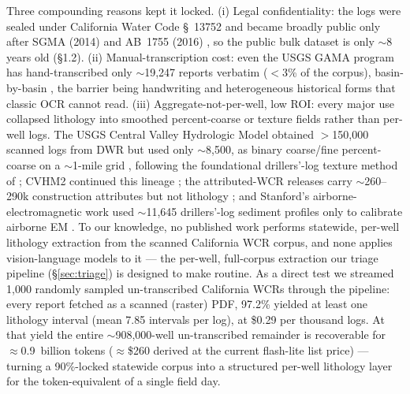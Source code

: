 \documentclass[12pt]{article}
\begin{document}
Three compounding reasons kept it locked. (i) Legal confidentiality: the logs were sealed under
California Water Code \S~13752 \citep{ca_watercode_13752} and became broadly public only after SGMA (2014) and
AB~1755 (2016) \citep{ca_ab1755}, so the public bulk dataset is only $\sim$8 years old (\S1.2).
(ii) Manual-transcription cost: even the USGS GAMA program has hand-transcribed only $\sim$19{,}247
reports verbatim ($<$3\% of the corpus), basin-by-basin \citep{haugen2023_gama}, the barrier being handwriting
and heterogeneous historical forms that classic OCR cannot read. (iii) Aggregate-not-per-well, low ROI:
every major use collapsed lithology into smoothed percent-coarse or texture fields rather than per-well logs.
The USGS Central Valley Hydrologic Model obtained $>$150{,}000 scanned logs from DWR but used only $\sim$8{,}500,
as binary coarse/fine percent-coarse on a $\sim$1-mile grid \citep{cvhm_faunt2009,faunt2010}, following the
foundational drillers'-log texture method of \citet{laudon_belitz1991}; CVHM2 continued this lineage
\citep{cvhm2_marcelli2022}; the attributed-WCR releases carry $\sim$260--290k construction attributes but not
lithology \citep{borkovich2023_wcr}; and Stanford's airborne-electromagnetic work used $\sim$11{,}645 drillers'-log
sediment profiles only to calibrate airborne EM \citep{knight2018aem,kang2025aem}. To our knowledge, no
published work performs statewide, per-well lithology extraction from the scanned California WCR corpus, and
none applies vision-language models to it --- the per-well, full-corpus extraction our triage pipeline
(\S\ref{sec:triage}) is designed to make routine. As a direct test we streamed 1{,}000 randomly sampled
un-transcribed California WCRs through the pipeline: every report fetched as a scanned (raster) PDF,
97.2\% yielded at least one lithology interval (mean 7.85 intervals per log), at \$0.29 per thousand logs.
At that yield the entire $\sim$908{,}000-well un-transcribed remainder is recoverable for
$\approx$0.9~billion tokens ($\approx$\$260 derived at the current flash-lite list price) --- turning a
90\%-locked statewide corpus into a structured per-well lithology layer for the token-equivalent of a single
field day.
\end{document}
